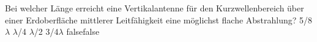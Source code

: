     {Bei welcher Länge erreicht eine Vertikalantenne für den Kurzwellenbereich über einer Erdoberfläche mittlerer Leitfähigkeit eine möglichst flache Abstrahlung?}
    {5/8$ \lambda$}
    {$\lambda$/4}
    {$\lambda$/2}
    {3/4$ \lambda$}
    {false}{false}